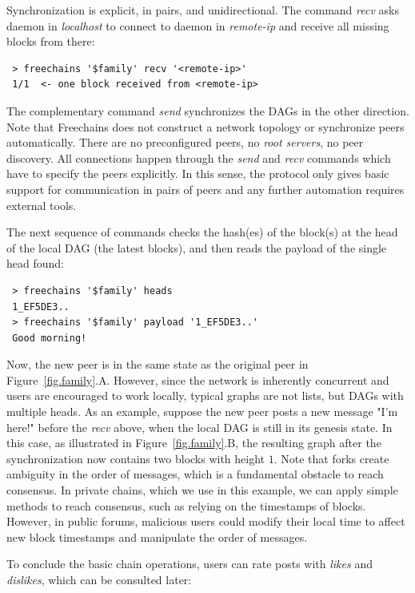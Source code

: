 \documentclass[10pt,journal,compsoc]{IEEEtran}
\newcommand{\FC}       {Freechains\xspace}
\begin{document}
Synchronization is explicit, in pairs, and unidirectional.
The command \emph{recv} asks daemon in \emph{localhost} to connect to daemon in
\emph{remote-ip} and receive all missing blocks from there:

{\footnotesize
\begin{verbatim}
 > freechains '$family' recv '<remote-ip>'
 1/1  <- one block received from <remote-ip>
\end{verbatim}
}

The complementary command \emph{send} synchronizes the DAGs in the other
direction.
Note that \FC does not construct a network topology or synchronize peers
automatically.
There are no preconfigured peers, no \emph{root servers}, no peer discovery.
All connections happen through the \emph{send} and \emph{recv} commands which
have to specify the peers explicitly.
In this sense, the protocol only gives basic support for communication in pairs
of peers and any further automation requires external tools.

The next sequence of commands checks the hash(es) of the block(s) at the head
of the local DAG (the latest blocks), and then reads the payload of the single
head found:

{\footnotesize
\begin{verbatim}
 > freechains '$family' heads
 1_EF5DE3..
 > freechains '$family' payload '1_EF5DE3..'
 Good morning!
\end{verbatim}
}

Now, the new peer is in the same state as the original peer in
Figure~\ref{fig.family}.A.
However, since the network is inherently concurrent and users are encouraged to
work locally, typical graphs are not lists, but DAGs with multiple heads.
As an example, suppose the new peer posts a new message "I'm here!" before the
\emph{recv} above, when the local DAG is still in its genesis state.
In this case, as illustrated in Figure~\ref{fig.family}.B, the resulting graph
after the synchronization now contains two blocks with height $1$.
%
Note that forks create ambiguity in the order of messages, which is a
fundamental obstacle to reach consensus.
In private chains, which we use in this example, we can apply simple methods to
reach consensus, such as relying on the timestamps of blocks.
However, in public forums, malicious users could modify their local time to
affect new block timestamps and manipulate the order of messages.

To conclude the basic chain operations, users can rate posts with \emph{likes}
and \emph{dislikes}, which can be consulted later:
\end{document}
